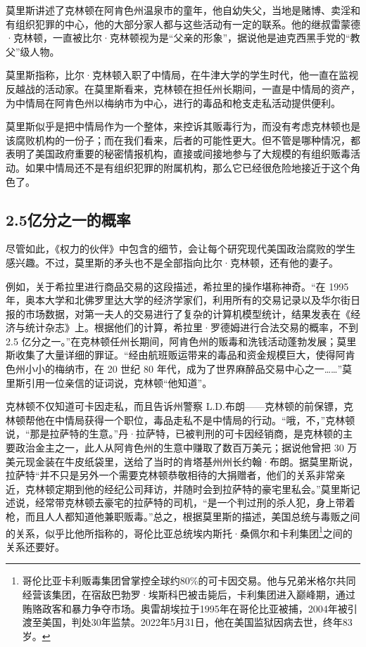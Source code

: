 莫里斯讲述了克林顿在阿肯色州温泉市的童年，他自幼失父，当地是赌博、卖淫和有组织犯罪的中心，他的大部分家人都与这些活动有一定的联系。他的继叔雷蒙德·克林顿，一直被比尔·克林顿视为是“父亲的形象”，据说他是迪克西黑手党的“教父”级人物。

莫里斯指称，比尔·克林顿入职了中情局，在牛津大学的学生时代，他一直在监视反越战的活动家。在莫里斯看来，克林顿在担任州长期间，一直是中情局的资产，为中情局在阿肯色州以梅纳市为中心，进行的毒品和枪支走私活动提供便利。

莫里斯似乎是把中情局作为一个整体，来控诉其贩毒行为，而没有考虑克林顿也是该腐败机构的一份子；而在我们看来，后者的可能性更大。但不管是哪种情况，都表明了美国政府重要的秘密情报机构，直接或间接地参与了大规模的有组织贩毒活动。如果中情局还不是有组织犯罪的附属机构，那么它已经很危险地接近于这个角色了。

\subsection{2.5亿分之一的概率}
尽管如此，《权力的伙伴》中包含的细节，会让每个研究现代美国政治腐败的学生感兴趣。不过，莫里斯的矛头也不是全部指向比尔·克林顿，还有他的妻子。

例如，关于希拉里进行商品交易的这段描述，希拉里的操作堪称神奇。“在 1995年，奥本大学和北佛罗里达大学的经济学家们，利用所有的交易记录以及华尔街日报的市场数据，对第一夫人的交易进行了复杂的计算机模型统计，结果发表在《经济与统计杂志》上。根据他们的计算，希拉里·罗德姆进行合法交易的概率，不到 2.5 亿分之一。”在克林顿任州长期间，阿肯色州的贩毒和洗钱活动蓬勃发展；莫里斯收集了大量详细的罪证。“经由航班贩运带来的毒品和资金规模巨大，使得阿肯色州小小的梅纳市，在 20 世纪 80 年代，成为了世界麻醉品交易中心之一……”莫里斯引用一位亲信的证词说，克林顿“他知道”。

克林顿不仅知道可卡因走私，而且告诉州警察 L.D.布朗——克林顿的前保镖，克林顿帮他在中情局获得一个职位，毒品走私不是中情局的行动。“哦，不，”克林顿说，“那是拉萨特的生意。”丹·拉萨特，已被判刑的可卡因经销商，是克林顿的主要政治金主之一，此人从阿肯色州的生意中赚取了数百万美元；据说他曾把 30 万美元现金装在牛皮纸袋里，送给了当时的肯塔基州州长约翰·布朗。据莫里斯说，拉萨特“并不只是另外一个需要克林顿恭敬相待的大捐赠者，他们的关系非常亲近，克林顿定期到他的经纪公司拜访，并随时会到拉萨特的豪宅里私会。”莫里斯记述说，经常带克林顿去豪宅的拉萨特的司机，“是一个判过刑的杀人犯，身上带着枪，而且人人都知道他兼职贩毒。”总之，根据莫里斯的描述，美国总统与毒贩之间的关系，似乎比他所指称的，哥伦比亚总统埃内斯托·桑佩尔和卡利集团\footnote{哥伦比亚卡利贩毒集团曾掌控全球约80\%的可卡因交易。他与兄弟米格尔共同经营该集团，在宿敌巴勃罗·埃斯科巴被击毙后，卡利集团进入巅峰期，通过贿赂政客和暴力争夺市场。奥雷胡埃拉于1995年在哥伦比亚被捕，2004年被引渡至美国，判处30年监禁。2022年5月31日，他在美国监狱因病去世，终年83岁。}之间的关系还要好。

